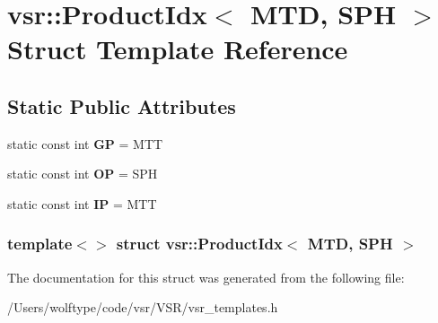 \hypertarget{structvsr_1_1_product_idx_3_01_m_t_d_00_01_s_p_h_01_4}{\section{vsr\-:\-:Product\-Idx$<$ M\-T\-D, S\-P\-H $>$ Struct Template Reference}
\label{structvsr_1_1_product_idx_3_01_m_t_d_00_01_s_p_h_01_4}
}
\subsection*{Static Public Attributes}
\begin{DoxyCompactItemize}
\item 
\hypertarget{structvsr_1_1_product_idx_3_01_m_t_d_00_01_s_p_h_01_4_a975939303a8e1b82100e8c1c64cc5979}{static const int {\bfseries G\-P} = M\-T\-T}\label{structvsr_1_1_product_idx_3_01_m_t_d_00_01_s_p_h_01_4_a975939303a8e1b82100e8c1c64cc5979}

\item 
\hypertarget{structvsr_1_1_product_idx_3_01_m_t_d_00_01_s_p_h_01_4_a1ba161ca3ec91a78e951354bd23768d8}{static const int {\bfseries O\-P} = S\-P\-H}\label{structvsr_1_1_product_idx_3_01_m_t_d_00_01_s_p_h_01_4_a1ba161ca3ec91a78e951354bd23768d8}

\item 
\hypertarget{structvsr_1_1_product_idx_3_01_m_t_d_00_01_s_p_h_01_4_a5864b036efef99251b33cb478a459a64}{static const int {\bfseries I\-P} = M\-T\-T}\label{structvsr_1_1_product_idx_3_01_m_t_d_00_01_s_p_h_01_4_a5864b036efef99251b33cb478a459a64}

\end{DoxyCompactItemize}
\subsubsection*{template$<$$>$ struct vsr\-::\-Product\-Idx$<$ M\-T\-D, S\-P\-H $>$}



The documentation for this struct was generated from the following file\-:\begin{DoxyCompactItemize}
\item 
/\-Users/wolftype/code/vsr/\-V\-S\-R/vsr\-\_\-templates.\-h\end{DoxyCompactItemize}
